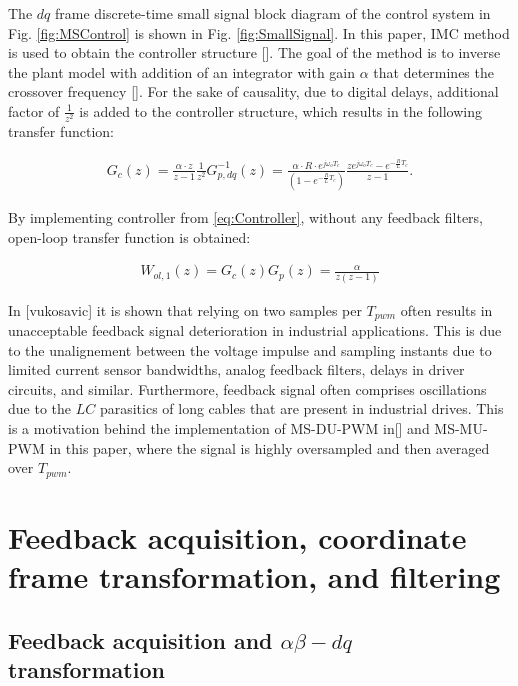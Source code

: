 \documentclass[journal]{IEEEtran}
\begin{document}
The $dq$ frame discrete-time small signal block diagram of the control system in Fig. \ref{fig:MSControl} is shown in Fig. \ref{fig:SmallSignal}. In this paper, IMC method is used to obtain the controller structure []. The goal of the method is to inverse the plant model with addition of an integrator with gain $\alpha$ that determines the crossover frequency []. For the sake of causality, due to digital delays, additional factor of $\frac{1}{z^2}$ is added to the controller structure, which results in the following transfer function:

\begin{equation}
\begin{aligned}
G_{c}(z) =  \frac{\alpha \cdot z}{z-1} \frac{1}{z^2} G^{-1}_{p,dq}(z)  =   \frac{\alpha \cdot R \cdot e^{j\omega_o T_c}}{\left( 1 - e^{-\frac{R}{L}T_c}\right)}\frac{z e^{j\omega_o T_c}-e^{-\frac{R}{L}T_c}}{z-1}.
\label{eq:Controller} 
\end{aligned}    
\end{equation}

By implementing controller from \eqref{eq:Controller}, without any feedback filters, open-loop transfer function is obtained:

\begin{equation}
\begin{aligned}
W_{ol,1}(z) = G_c(z) G_p(z) =  \frac{\alpha}{z(z-1)}
\label{eq:OpenLoop} 
\end{aligned}    
\end{equation}

In [vukosavic] it is shown that relying on two samples per $T_{pwm}$ often results in unacceptable feedback signal deterioration in industrial applications. This is due to the unalignement between the voltage impulse and sampling instants due to limited current sensor bandwidths, analog feedback filters, delays in driver circuits, and similar. Furthermore, feedback signal often comprises oscillations due to the $LC$ parasitics of long cables that are present in industrial drives. This is a motivation behind the implementation of MS-DU-PWM in[] and MS-MU-PWM in this paper, where the signal is highly oversampled and then averaged over $T_{pwm}$.

\section{Feedback acquisition, coordinate frame transformation, and filtering}

\subsection{Feedback acquisition and $\alpha \beta - dq$ transformation}
\end{document}
